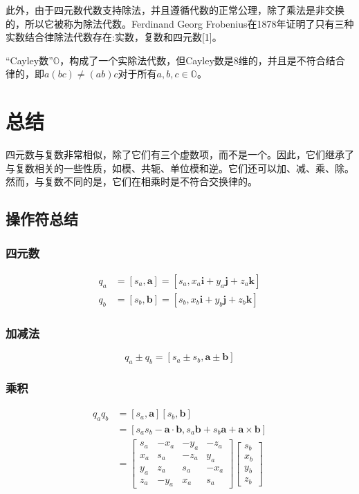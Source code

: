 此外，由于四元数代数支持除法，并且遵循代数的正常公理，除了乘法是非交换的，所以它被称为除法代数。Ferdinand Georg Frobenius在1878年证明了只有三种实数结合律除法代数存在:实数，复数和四元数[1]。

“Cayley数”$\mathbb{O}$，构成了一个实除法代数，但Cayley数是8维的，并且是不符合结合律的，即$a(b c) \neq(a b) c$对于所有$a, b, c \in \mathbb{O}$。

\section{总结}
四元数与复数非常相似，除了它们有三个虚数项，而不是一个。因此，它们继承了与复数相关的一些性质，如模、共轭、单位模和逆。它们还可以加、减、乘、除。然而，与复数不同的是，它们在相乘时是不符合交换律的。

\subsection{操作符总结}
\subsubsection*{四元数}
$$
\begin{aligned}
q_{a} & =\left[s_{a}, \mathbf{a}\right]=\left[s_{a}, x_{a} \mathbf{i}+y_{a} \mathbf{j}+z_{a} \mathbf{k}\right] \\
q_{b} & =\left[s_{b}, \mathbf{b}\right]=\left[s_{b}, x_{b} \mathbf{i}+y_{b} \mathbf{j}+z_{b} \mathbf{k}\right]
\end{aligned}
$$

\subsubsection*{加减法}
$$
q_{a} \pm q_{b}=\left[s_{a} \pm s_{b}, \mathbf{a} \pm \mathbf{b}\right]
$$

\subsubsection*{乘积}
$$
\begin{aligned}
q_{a} q_{b} & =\left[s_{a}, \mathbf{a}\right]\left[s_{b}, \mathbf{b}\right] \\
& =\left[s_{a} s_{b}-\mathbf{a} \cdot \mathbf{b}, s_{a} \mathbf{b}+s_{b} \mathbf{a}+\mathbf{a} \times \mathbf{b}\right] \\
& =\left[\begin{array}{cccc}
s_{a} & -x_{a} & -y_{a} & -z_{a} \\
x_{a} & s_{a} & -z_{a} & y_{a} \\
y_{a} & z_{a} & s_{a} & -x_{a} \\
z_{a} & -y_{a} & x_{a} & s_{a}
\end{array}\right]\left[\begin{array}{c}
s_{b} \\
x_{b} \\
y_{b} \\
z_{b}
\end{array}\right]
\end{aligned}
$$

